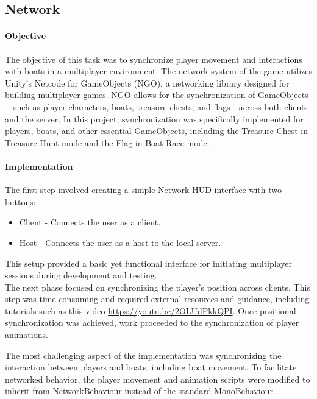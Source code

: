 \documentclass{article}
\begin{document}
\newpage
\subsection{Network}
\paragraph{Objective}\hfill

The objective of this task was to synchronize player movement and interactions with boats in a multiplayer environment. The network system of the game utilizes Unity's Netcode for GameObjects (NGO), a networking library designed for building multiplayer games. NGO allows for the synchronization of GameObjects—such as player characters, boats, treasure chests, and flags—across both clients and the server. In this project, synchronization was specifically implemented for players, boats, and other essential GameObjects, including the Treasure Chest in Treasure Hunt mode and the Flag in Boat Race mode.

\paragraph{Implementation}\hfill

The first step involved creating a simple Network HUD interface with two buttons:\
\begin{itemize}
    \item Client - Connects the user as a client.
    \item Host - Connects the user as a host to the local server.
\end{itemize}

This setup provided a basic yet functional interface for initiating multiplayer sessions during development and testing.\\

The next phase focused on synchronizing the player's position across clients. This step was time-consuming and required external resources and guidance, including tutorials such as this video \url{https://youtu.be/2OLUdPkkQPI}. Once positional synchronization was achieved, work proceeded to the synchronization of player animations.

The most challenging aspect of the implementation was synchronizing the interaction between players and boats, including boat movement. To facilitate networked behavior, the player movement and animation scripts were modified to inherit from NetworkBehaviour instead of the standard MonoBehaviour.\\
\end{document}

